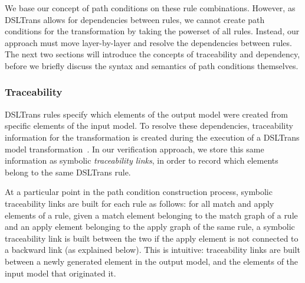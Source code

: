 We base our concept of path conditions on these rule combinations. However, as
DSLTrans allows for dependencies between rules, we cannot create path conditions
for the transformation by taking the powerset of all rules. Instead, our
approach must move layer-by-layer and resolve the dependencies between rules.
The next two sections will introduce the concepts of traceability and dependency, before we
briefly discuss the syntax and semantics of path conditions themselves.

\subsubsection{Traceability}
\label{subsubsec:traceability}

DSLTrans rules specify which elements of the
output model were created from specific elements of the input model. To resolve
these dependencies, traceability information for the transformation is created
during the execution of a DSLTrans model transformation~\cite{DBLP:conf/sle/BarrocaLAFS10}.
In our verification approach, we store this same information as symbolic \emph{traceability links}, in
order to record which elements belong to the same DSLTrans rule.


At a particular point in the path condition construction process, symbolic traceability links are built for
each rule as follows: for all match and apply elements of a rule, given a match
element belonging to the match graph of a rule and an apply element belonging to
the apply graph of the same rule, a symbolic traceability link is built between the two
if the apply element is not connected to a backward link (as explained below).
This is intuitive: traceability links are built between a newly generated
element in the output model, and the elements of the input model that originated
it.


